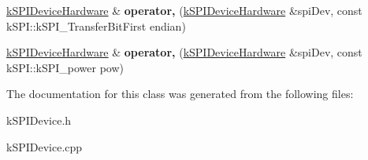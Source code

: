 \begin{DoxyCompactItemize}
\item 
\hyperlink{classkSPIDeviceHardware}{k\+S\+P\+I\+Device\+Hardware} \& {\bfseries operator,} (\hyperlink{classkSPIDeviceHardware}{k\+S\+P\+I\+Device\+Hardware} \&spi\+Dev, const k\+S\+P\+I\+::k\+S\+P\+I\+\_\+\+Transfer\+Bit\+First endian)\hypertarget{classkSPIDeviceHardware_addfb62b4b46014f54cfb049134c36117}{}\label{classkSPIDeviceHardware_addfb62b4b46014f54cfb049134c36117}

\item 
\hyperlink{classkSPIDeviceHardware}{k\+S\+P\+I\+Device\+Hardware} \& {\bfseries operator,} (\hyperlink{classkSPIDeviceHardware}{k\+S\+P\+I\+Device\+Hardware} \&spi\+Dev, const k\+S\+P\+I\+::k\+S\+P\+I\+\_\+power pow)\hypertarget{classkSPIDeviceHardware_a5962811e308e7fc7dca2fcb1e5da8c5c}{}\label{classkSPIDeviceHardware_a5962811e308e7fc7dca2fcb1e5da8c5c}

\end{DoxyCompactItemize}


The documentation for this class was generated from the following files\+:\begin{DoxyCompactItemize}
\item 
k\+S\+P\+I\+Device.\+h\item 
k\+S\+P\+I\+Device.\+cpp\end{DoxyCompactItemize}
